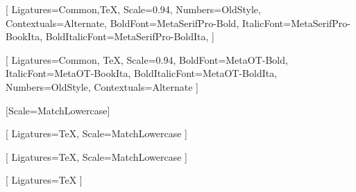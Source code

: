 %



\setmainfont{MetaSerifPro-Book}[
    Ligatures={Common,TeX},
    Scale=0.94, %
    Numbers={OldStyle},
    Contextuals={Alternate},
    BoldFont=MetaSerifPro-Bold,
    ItalicFont=MetaSerifPro-BookIta,
    BoldItalicFont=MetaSerifPro-BoldIta,
]

\setsansfont{MetaOT-Book}[
    Ligatures={Common, TeX},
    Scale=0.94,
    BoldFont=MetaOT-Bold,
    ItalicFont=MetaOT-BookIta,
    BoldItalicFont=MetaOT-BoldIta,
    Numbers={OldStyle},
    Contextuals={Alternate}
]

\setmonofont{Iosevka}[Scale=MatchLowercase]

[
    Ligatures=TeX,
    Scale=MatchLowercase
]

\setmathfontface{}[
    Ligatures=TeX,
    Scale=MatchLowercase
]

\setoperatorfont\mathoper

\newfontface{}[
    Ligatures=TeX
]
